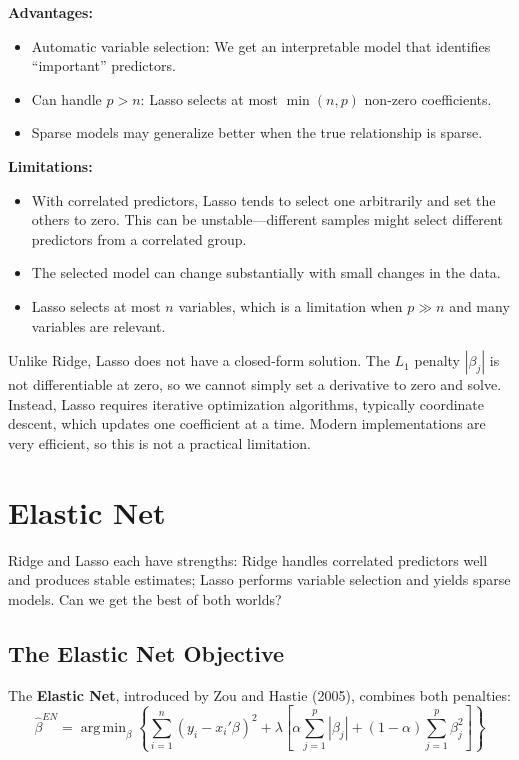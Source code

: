 \documentclass[11pt,a4paper]{article}
\DeclareMathOperator*{\argmin}{arg\,min}
\newcommand{\keyword}[1]{\textbf{\textcolor{AccentOrange}{#1}}}
\begin{document}
\textbf{Advantages:}
\begin{itemize}
    \item Automatic variable selection: We get an interpretable model that identifies ``important'' predictors.
    \item Can handle $p > n$: Lasso selects at most $\min(n, p)$ non-zero coefficients.
    \item Sparse models may generalize better when the true relationship is sparse.
\end{itemize}

\textbf{Limitations:}
\begin{itemize}
    \item With correlated predictors, Lasso tends to select one arbitrarily and set the others to zero. This can be unstable---different samples might select different predictors from a correlated group.
    \item The selected model can change substantially with small changes in the data.
    \item Lasso selects at most $n$ variables, which is a limitation when $p \gg n$ and many variables are relevant.
\end{itemize}

Unlike Ridge, Lasso does not have a closed-form solution. The $L_1$ penalty $|\beta_j|$ is not differentiable at zero, so we cannot simply set a derivative to zero and solve. Instead, Lasso requires iterative optimization algorithms, typically coordinate descent, which updates one coefficient at a time. Modern implementations are very efficient, so this is not a practical limitation.

\section{Elastic Net}

Ridge and Lasso each have strengths: Ridge handles correlated predictors well and produces stable estimates; Lasso performs variable selection and yields sparse models. Can we get the best of both worlds?

\subsection{The Elastic Net Objective}

The \keyword{Elastic Net}, introduced by Zou and Hastie (2005), combines both penalties:
\[
\widehat{\beta}^{EN} = \argmin_\beta \left\{ \sum_{i=1}^n (y_i - x_i'\beta)^2 + \lambda \left[ \alpha \sum_{j=1}^p |\beta_j| + (1-\alpha) \sum_{j=1}^p \beta_j^2 \right] \right\}
\]
\end{document}
